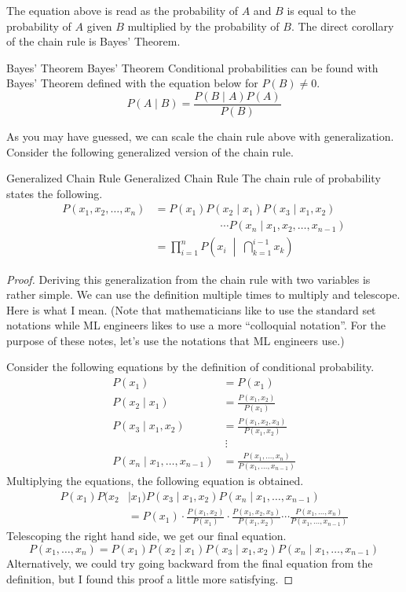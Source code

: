 \documentclass[../../main.tex]{subfiles}
\begin{document}
The equation above is read as the probability of $A$ and $B$
is equal to the probability of $A$ given $B$ multiplied by
the probability of $B$. The direct corollary of the chain rule
is Bayes' Theorem.

\begin{theorem}
{Bayes' Theorem}
{Bayes' Theorem}
Conditional probabilities can be found with Bayes' Theorem
defined with the equation below for $P(B) \neq 0$.
\[
P(A \mid B) = \frac{P(B \mid A) P(A)}{P(B)}
\]
\end{theorem}

As you may have guessed, we can scale the chain rule above
with generalization. Consider the following generalized version
of the chain rule.

\begin{theorem}
{Generalized Chain Rule}
{Generalized Chain Rule}
The chain rule of probability states the following.
\begin{align*}
    P(x_1, x_2, \ldots, x_n)
    &= P(x_1) P(x_2 \mid x_1) P(x_3 \mid x_1, x_2) \\
        &\qquad\qquad\qquad\cdots
            P(x_n \mid x_1, x_2, \ldots, x_{n-1}) \\
    &= \prod_{i = 1}^{n} P \left(
        x_i \; \middle|\; \bigcap_{k = 1}^{i - 1} x_{k}
    \right)
\end{align*}
\end{theorem}
\begin{proof}
Deriving this generalization from the chain rule with two
variables is rather simple. We can use the definition multiple
times to multiply and telescope. Here is what I mean. (Note
that mathematicians like to use the standard set notations while
ML engineers likes to use a more ``colloquial notation''. For
the purpose of these notes, let's use the notations that ML
engineers use.)

Consider the following equations by the definition of conditional
probability.
\begin{align*}
    P(x_1) &= P(x_1) \\
    P(x_2 \mid x_1) &= \frac{P(x_1, x_2)}{P(x_1)} \\
    P(x_3 \mid x_1, x_2) &= \frac{P(x_1, x_2, x_3)}{P(x_1, x_2)} \\
    &\ \vdots \\
    P(x_n \mid x_1, \ldots, x_{n-1})
        &= \frac{P(x_1, \ldots, x_n)}{P(x_1, \ldots, x_{n-1})}
\end{align*}
Multiplying the equations, the following equation is obtained.
\begin{align*}
    P(x_1) P(x_2 &\mid x_1) P(x_3 \mid x_1, x_2)
        P(x_n \mid x_1, \ldots, x_{n-1}) \\
    &= P(x_1) \cdot \frac{P(x_1, x_2)}{P(x_1)} \cdot
        \frac{P(x_1, x_2, x_3)}{P(x_1, x_2)} \cdots
        \frac{P(x_1, \ldots, x_n)}{P(x_1, \ldots, x_{n-1})}
\end{align*}
Telescoping the right hand side, we get our final equation.
\[
P(x_1, \ldots, x_n)
= P(x_1) P(x_2 \mid x_1) P(x_3 \mid x_1, x_2)
    P(x_n \mid x_1, \ldots, x_{n-1})
\]
Alternatively, we could try going backward from the final
equation from the definition, but I found this proof a little
more satisfying.
\end{proof}
\end{document}
